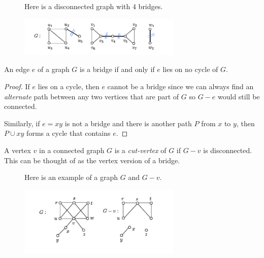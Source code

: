 \begin{figure}[ht]
\begin{nexample}
  Here is a disconnected graph with 4 bridges.

  \centering
  \includegraphics[width=0.69\textwidth]{figures/l09/bridge-examples}
\end{nexample}
\end{figure}

\begin{theorem}
  An edge \(e\) of a graph \(G\) is a bridge if and only if \(e\)
  lies on no cycle of \(G\).
\end{theorem}

\begin{proof}
  If \(e\) lies on a cycle, then \(e\) cannot be a bridge since
  we can always find an \textit{alternate} path between any two
  vertices that are part of \(G\) so \(G-e\) would still be
  connected.

  Similarly, if \(e=xy\) is not a bridge and there is another
  path \(P\) from \(x\) to \(y\), then \(P \cup {xy}\) forms a
  cycle that contains \(e\).
\end{proof}

\begin{definition}
  A vertex \(v\) in a connected graph \(G\) is a
  \textit{cut-vertex} of \(G\) if \(G-v\) is disconnected.
  This can be thought of as the vertex version of a bridge.
\end{definition}

\begin{figure}[ht]
\begin{nexample}
  Here is an example of a graph \(G\) and \(G-v\).

  \centering
  \includegraphics[width=0.69\textwidth]{figures/l09/cut-vertex-example}
\end{nexample}
\end{figure}

